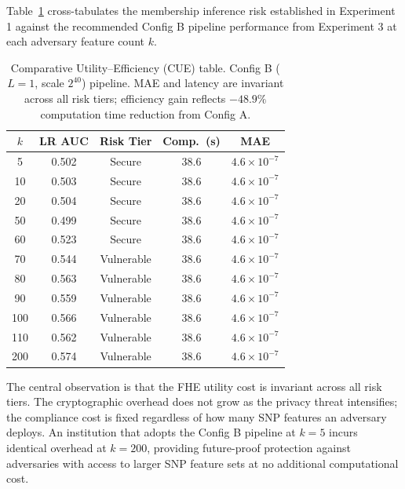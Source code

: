 \documentclass[conference]{IEEEtran}
\begin{document}
Table~\ref{tab:cue} cross-tabulates the membership inference risk established
in Experiment 1 against the recommended Config B pipeline performance from
Experiment 3 at each adversary feature count $k$.

\begin{table}[t]
\caption{Comparative Utility--Efficiency (CUE) table. Config B ($L=1$, scale
$2^{40}$) pipeline. MAE and latency are invariant across all risk tiers;
efficiency gain reflects $-48.9\%$ computation time reduction from Config A.}
\label{tab:cue}
\begin{center}
\begin{tabular}{ccccc}
\toprule
$k$ & LR AUC & Risk Tier & Comp.\ (s) & MAE \\
\midrule
5   & 0.502 & Secure       & 38.6 & $4.6\times10^{-7}$ \\
10  & 0.503 & Secure       & 38.6 & $4.6\times10^{-7}$ \\
20  & 0.504 & Secure       & 38.6 & $4.6\times10^{-7}$ \\
50  & 0.499 & Secure       & 38.6 & $4.6\times10^{-7}$ \\
60  & 0.523 & Secure       & 38.6 & $4.6\times10^{-7}$ \\
70  & 0.544 & Vulnerable   & 38.6 & $4.6\times10^{-7}$ \\
80  & 0.563 & Vulnerable   & 38.6 & $4.6\times10^{-7}$ \\
90  & 0.559 & Vulnerable   & 38.6 & $4.6\times10^{-7}$ \\
100 & 0.566 & Vulnerable   & 38.6 & $4.6\times10^{-7}$ \\
110 & 0.562 & Vulnerable   & 38.6 & $4.6\times10^{-7}$ \\
200 & 0.574 & Vulnerable   & 38.6 & $4.6\times10^{-7}$ \\
\bottomrule
\end{tabular}
\end{center}
\end{table}

The central observation is that the FHE utility cost is invariant across all
risk tiers. The cryptographic overhead does not grow as the privacy threat
intensifies; the compliance cost is fixed regardless of how many SNP features
an adversary deploys. An institution that adopts the Config B pipeline at $k=5$
incurs identical overhead at $k=200$, providing future-proof protection against
adversaries with access to larger SNP feature sets at no additional computational
cost.

\end{document}
